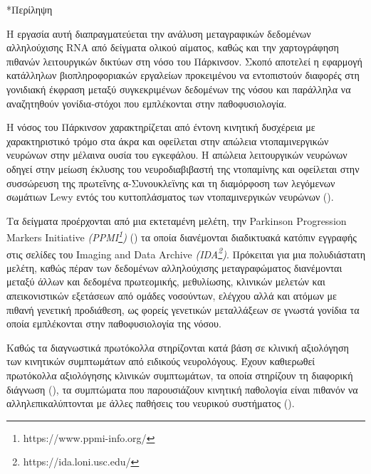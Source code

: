 \documentclass[12pt]{report}
\makeatletter
\let\oldchapter\chapter
\renewcommand{\chapter}{\@ifstar{\starchapter}{\nostarchapter}}
\newcommand{\starchapter}[1]{\oldchapter*{#1}\thispagestyle{mainstyle}}
\newcommand{\nostarchapter}[1]{\oldchapter{#1}\thispagestyle{mainstyle}}
\let\oldfootnote\footnote
\renewcommand{\footnote}[1]{\oldfootnote{\onehalfspacing #1}}
\makeatother
\begin{document}
\cleardoublepage
\pagestyle{mainstyle}

\chapter*{Περίληψη}
    \par
        H εργασία αυτή διαπραγματεύεται την ανάλυση μεταγραφικών δεδομένων αλληλούχισης RNA από δείγματα ολικού αίματος, καθώς και την χαρτογράφηση πιθανών λειτουργικών δικτύων στη νόσο του Πάρκινσον. Σκοπό αποτελεί η εφαρμογή κατάλληλων βιοπληροφοριακών εργαλείων προκειμένου να εντοπιστούν διαφορές στη γονιδιακή έκφραση μεταξύ συγκεκριμένων δεδομένων της νόσου και παράλληλα να αναζητηθούν γονίδια-στόχοι που εμπλέκονται στην παθοφυσιολογία.
    \par
        Η νόσος του Πάρκινσον χαρακτηρίζεται από έντονη κινητική δυσχέρεια με χαρακτηριστικό τρόμο στα άκρα και οφείλεται στην απώλεια ντοπαμινεργικών νευρώνων στην μέλαινα ουσία του εγκεφάλου. Η απώλεια λειτουργικών νευρώνων οδηγεί στην μείωση έκλυσης του νευροδιαβιβαστή της ντοπαμίνης και οφείλεται στην συσσώρευση της πρωτεΐνης α-Συνουκλεϊνης και τη διαμόρφοση των λεγόμενων σωμάτιων Lewy εντός του κυττοπλάσματος των ντοπαμινεργικών νευρώνων (\emph{\cite{Balestrino2020ParkinsonDisease}}).
    \par
        Τα δείγματα προέρχονται από μια εκτεταμένη μελέτη, την Parkinson Progression Markers Initiative \emph{(PPMI\footnote{https://www.ppmi-info.org/})} (\emph{\cite{Marek2011ThePPMI}}) τα οποία διανέμονται διαδικτυακά κατόπιν εγγραφής στις σελίδες του Imaging and Data Archive \emph{(IDA\footnote{https://ida.loni.usc.edu/})}. Πρόκειται για μια πολυδιάστατη μελέτη, καθώς πέραν των δεδομένων αλληλούχισης μεταγραφώματος διανέμονται μεταξύ άλλων και δεδομένα πρωτεομικής, μεθυλίωσης, κλινικών μελετών και απεικονιστικών εξετάσεων από ομάδες νοσούντων, ελέγχου αλλά και ατόμων με πιθανή γενετική προδιάθεση, ως φορείς γενετικών μεταλλάξεων σε γνωστά γονίδια τα οποία εμπλέκονται στην παθοφυσιολογία της νόσου.
    \par
        Καθώς τα διαγνωστικά πρωτόκολλα στηρίζονται κατά βάση σε κλινική αξιολόγηση των κινητικών συμπτωμάτων από ειδικούς νευρολόγους. Έχουν καθιερωθεί πρωτόκολλα αξιολόγησης κλινικών συμπτωμάτων, τα οποία στηρίζουν τη διαφορική διάγνωση (\emph{\cite{Koller2018TableGuidelines}}), τα συμπτώματα που παρουσιάζουν κινητική παθολογία είναι πιθανόν να αλληλεπικαλύπτονται με άλλες παθήσεις του νευρικού συστήματος (\emph{\cite{Tolosa2021ChallengesDisease}}). 
\end{document}
